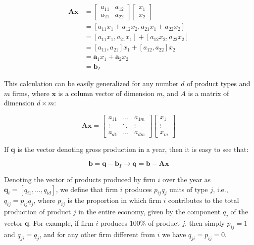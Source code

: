 \begin{align}
\boldsymbol{A}\boldsymbol{x} & =\left[\begin{array}{cc}
a_{11} & a_{12}\\
a_{21} & a_{22}
\end{array}\right]\left[\begin{array}{c}
x_{1}\\
x_{2}
\end{array}\right]\\
 & =\left[a_{11}x_{1}+a_{12}x_{2},a_{21}x_{1}+a_{22}x_{2}\right]\\
 & =\left[a_{11}x_{1},a_{21}x_{1}\right]+\left[a_{12}x_{2},a_{22}x_{2}\right]\\
 & =\left[a_{11},a_{21}\right]x_{1}+\left[a_{12},a_{22}\right]x_{2}\\
 & =\boldsymbol{a}_{1}x_{1}+\boldsymbol{a}_{2}x_{2}\\
 & =\boldsymbol{b}_{I}
\end{align}

This calculation can be easily generalized for any number $d$ of product types and $m$ firms, where $\boldsymbol{x}$ is a column vector of dimension $m$, and $A$ is a matrix of dimension $d\times m$:


\begin{equation}
\boldsymbol{A}\boldsymbol{x}=\left[\begin{array}{ccc}
a_{11} & \dots & a_{1m}\\
\vdots & \ddots & \vdots\\
a_{d1} & \dots & a_{dm}
\end{array}\right]\left[\begin{array}{c}
x_{1}\\
\vdots\\
x_{m}
\end{array}\right]
\end{equation}

If $\boldsymbol{q}$ is the vector denoting gross production in a year, then it is easy to see that:


\begin{equation}
\boldsymbol{b}=\boldsymbol{q}-\boldsymbol{b}_{I}\rightarrow\boldsymbol{q}=\boldsymbol{b}-\boldsymbol{A}\boldsymbol{x}
\end{equation}

Denoting the vector of products produced by firm $i$ over the year as $\boldsymbol{q}_{i}=\left[q_{i1},\dots,q_{id}\right]$, we define that firm $i$ produces $p_{ij}q_{j}$ units of type $j$, i.e., $q_{ij}=p_{ij}q_{j}$, where $p_{ij}$ is the proportion in which firm $i$ contributes to the total production of product $j$ in the entire economy, given by the component $q_{j}$ of the vector $\boldsymbol{q}$. For example, if firm $i$ produces 100\% of product $j$, then simply $p_{ij}=1$ and $q_{ji}=q_{j}$, and for any other firm different from $i$ we have $q_{ji}=p_{ij}=0$.

